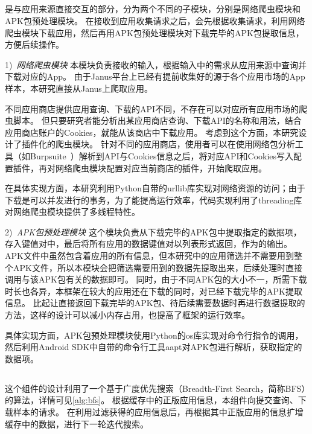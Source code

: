 \subsection{\componentA }
\componentA 是与应用来源直接交互的部分，分为两个不同的子模块，分别是网络爬虫模块和APK包预处理模块。
在接收到应用收集请求之后，\componentA 会先根据收集请求，利用网络爬虫模块下载应用，然后再用APK包预处理模块对下载完毕的APK包提取信息，方便后续操作。

1)\ \emph{网络爬虫模块} \quad
本模块负责接收\componentA 的输入，根据输入中的需求从应用来源中查询并下载对应的App。
由于Janus平台上已经有提前收集好的源于各个应用市场的App样本，本研究直接从Janus上爬取应用。

不同应用商店提供应用查询、下载的API不同，不存在可以对应所有应用市场的爬虫脚本。
但只要研究者能分析出某应用商店查询、下载API的名称和用法，结合应用商店账户的Cookies，就能从该商店中下载应用。
考虑到这个方面，本研究设计了插件化的爬虫模块。
针对不同的应用商店，使用者可以在使用网络包分析工具（如Burpsuite~\cite{burpsuite}）解析到API与Cookies信息之后，将对应API和Cookies写入配置插件，再对网络爬虫模块配置对应当前商店的插件，开始爬取应用。

在具体实现方面，本研究利用Python自带的urllib库实现对网络资源的访问；由于下载是可以并发进行的事务，为了能提高运行效率，代码实现利用了threading库对网络爬虫模块提供了多线程特性。

2)\ \emph{APK包预处理模块} \quad
这个模块负责从下载完毕的APK包中提取指定的数据项，存入键值对中，最后将所有应用的数据键值对以列表形式返回，作为\componentA 的输出。
APK文件中虽然包含着应用的所有信息，但本研究中的应用筛选并不需要用到整个APK文件，所以本模块会把筛选需要用到的数据先提取出来，后续处理时直接调用与该APK包有关的数据即可。
同时，由于不同APK包的大小不一，所需下载时长也各异，本框架在较大的应用还在下载的同时，对已经下载完毕的APK提取信息。
比起让\componentA 直接返回下载完毕的APK包、待后续需要数据时再进行数据提取的方法，这样的设计可以减小内存占用，也提高了框架的运行效率。

具体实现方面，APK包预处理模块使用Python的os库实现对命令行指令的调用，然后利用Android SDK中自带的命令行工具aapt对APK包进行解析，获取指定的数据项。


\subsection{\componentB }
这个组件的设计利用了一个基于广度优先搜索（Breadth-First Search，简称BFS）的算法，详情可见\autoref{alg:bfs}。
根据缓存中的正版应用信息，本组件向\componentA 提交查询、下载样本的请求。
在利用\componentC 过滤获得的应用信息后，再根据其中正版应用的信息扩增缓存中的数据，进行下一轮迭代搜索。

